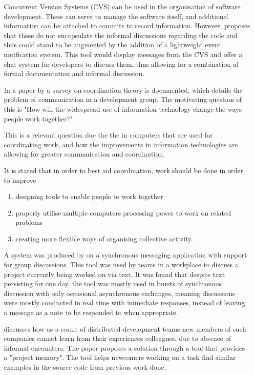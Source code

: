 \documentclass{l4proj}
\begin{document}
Concurrent Version Systems (CVS) can be used in the organisation of software development. These can serve to manage the software itself, and additional information can be attached to commits to record information.  However, \citet{fitzpatrick06cvs} proposes that these do not encapsulate the informal discussions regarding the code and thus could stand to be augmented by the addition of a lightweight event notification system.  This tool would display messages from the CVS and offer a chat system for developers to discuss them, thus allowing for a combination of formal documentation and informal discussion.

In a paper by \citet{malone94interdisciplinary} a survey on coordination theory is documented, which details the problem of communication in a development group.  The motivating question of this is "How will the widespread use of information technology change the ways people work together?"

This is a relevant question due the the in computers that are used for coordinating work, and how the improvements in information technologies are allowing for greater communication and coordination.

It is stated that in order to best aid coordination, work should be done in order to improve
\begin{enumerate}
\item designing tools to enable people to work together
\item properly utilise multiple computers processing power to work on related problems
\item creating more flexible ways of organising collective activity.
\end{enumerate}

A system was produced by \citet{handel02chat} on a synchronous messaging application with support for group discussions.  This tool was used by teams in a workplace to discuss a project currently being worked on via text. It was found that despite text persisting for one day, the tool was mostly used in bursts of synchronous discussion with only occasional asynchronous exchanges, meaning discussions were mostly conducted in real time with immediate responses, instead of leaving a message as a note to be responded to when appropriate. 

\citet{cubranic03hipikat} discusses how as a result of distributed development teams new members of such companies cannot learn from their experiences colleagues, due to absence of informal encounters. The paper proposes a solution through a tool that provides a "project memory".  The tool helps newcomers working on a task find similar examples in the source code from previous work done. 
\end{document}
